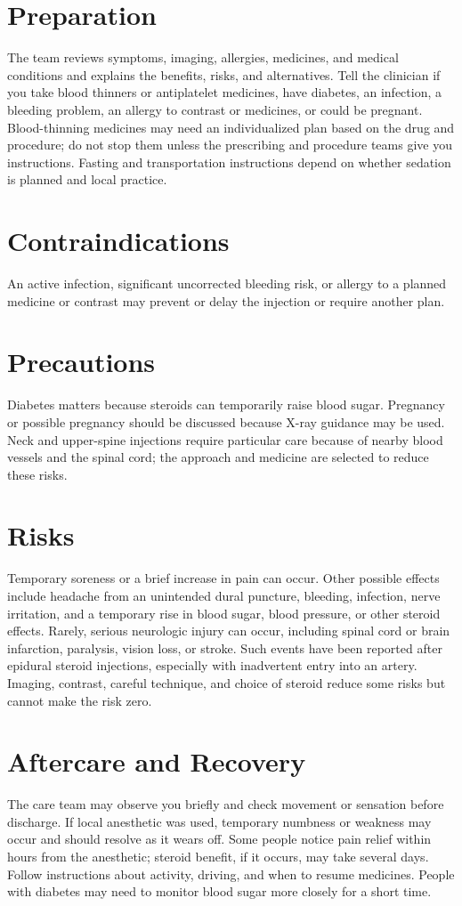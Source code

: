 \section*{Preparation}
The team reviews symptoms, imaging, allergies, medicines, and medical conditions and explains the benefits, risks, and alternatives. Tell the clinician if you take blood thinners or antiplatelet medicines, have diabetes, an infection, a bleeding problem, an allergy to contrast or medicines, or could be pregnant. Blood-thinning medicines may need an individualized plan based on the drug and procedure; do not stop them unless the prescribing and procedure teams give you instructions. Fasting and transportation instructions depend on whether sedation is planned and local practice.

\section*{Contraindications}
An active infection, significant uncorrected bleeding risk, or allergy to a planned medicine or contrast may prevent or delay the injection or require another plan.

\section*{Precautions}
Diabetes matters because steroids can temporarily raise blood sugar. Pregnancy or possible pregnancy should be discussed because X-ray guidance may be used. Neck and upper-spine injections require particular care because of nearby blood vessels and the spinal cord; the approach and medicine are selected to reduce these risks.

\section*{Risks}
Temporary soreness or a brief increase in pain can occur. Other possible effects include headache from an unintended dural puncture, bleeding, infection, nerve irritation, and a temporary rise in blood sugar, blood pressure, or other steroid effects. Rarely, serious neurologic injury can occur, including spinal cord or brain infarction, paralysis, vision loss, or stroke. Such events have been reported after epidural steroid injections, especially with inadvertent entry into an artery. Imaging, contrast, careful technique, and choice of steroid reduce some risks but cannot make the risk zero.

\section*{Aftercare and Recovery}
The care team may observe you briefly and check movement or sensation before discharge. If local anesthetic was used, temporary numbness or weakness may occur and should resolve as it wears off. Some people notice pain relief within hours from the anesthetic; steroid benefit, if it occurs, may take several days. Follow instructions about activity, driving, and when to resume medicines. People with diabetes may need to monitor blood sugar more closely for a short time.

